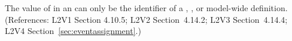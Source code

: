 The value of  in an \EventAssignment can only be the
identifier of a \Compartment, \Species, or model-wide \Parameter
definition.  (References: L2V1 Section 4.10.5; L2V2 Section~4.14.2;
L2V3 Section~4.14.4; L2V4 Section~\ref{sec:eventassignment}.)
